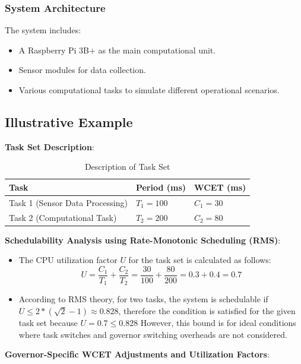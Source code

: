 \documentclass[conference]{IEEEtran}
\begin{document}
\subsubsection{System Architecture}
The system includes:
\begin{itemize}
    \item A Raspberry Pi 3B+ as the main computational unit.
    \item Sensor modules for data collection.
    \item Various computational tasks to simulate different operational scenarios.
\end{itemize}

\subsection{Illustrative Example}
\textbf{Task Set Description}:
\begin{table}[h!]
\centering
\begin{tabular}{lll}
\hline
\textbf{Task} & \textbf{Period (ms)} & \textbf{WCET (ms)} \\
\hline
Task 1 (Sensor Data Processing) & \( T_1 = 100 \) & \( C_1 = 30 \) \\
Task 2 (Computational Task)     & \( T_2 = 200 \) & \( C_2 = 80 \) \\
\hline
\end{tabular}
\label{tab:task_set}
\caption{Description of Task Set}
\end{table}

\textbf{Schedulability Analysis using Rate-Monotonic Scheduling (RMS)}:
\begin{itemize}
    \item The CPU utilization factor \( U \) for the task set is calculated as follows:
    \begin{equation}
        U = \frac{C_1}{T_1} + \frac{C_2}{T_2} = \frac{30}{100} + \frac{80}{200} = 0.3 + 0.4 = 0.7
    \end{equation}
    \item According to RMS theory, for two tasks, the system is schedulable if \( U \leq 2*(\sqrt{2} - 1) \approx 0.828 \), therefore the condition is satisfied for the given task set because $U = 0.7 \leq 0.828$ However, this bound is for ideal conditions where task switches and governor switching overheads are not considered.
\end{itemize}

\textbf{Governor-Specific WCET Adjustments and Utilization Factors}:
\end{document}
